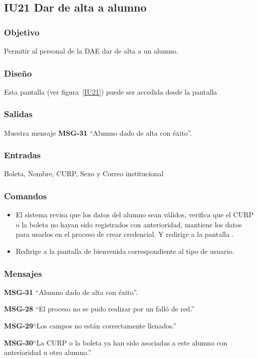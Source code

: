 
\subsection{IU21 Dar de alta a alumno}

\subsubsection{Objetivo}
	Permitir al personal de la DAE dar de alta a un alumno.
\subsubsection{Diseño}
    Esta pantalla  (ver figura~\ref{IU21}) puede ser accedida desde la pantalla 


\subsubsection{Salidas}
Muestra mensaje {\bf MSG-31} ``Alumno dado de alta con éxito''.
\subsubsection{Entradas}
    Boleta, Nombre, CURP, Sexo y Correo institucional
\subsubsection{Comandos}
\begin{itemize}
    \item {}  El sistema revisa que los datos del alumno sean válidos, verifica que el CURP o la boleta no hayan sido registrados con anterioridad, mantiene los datos para usarlos en el proceso de crear credencial. Y redirige a la pantalla .
    \item {} Redirige a la pantalla de bienvenida correspondiente al tipo de usuario.
    
\end{itemize}

\subsubsection{Mensajes}

\begin{Citemize}
    \item {\bf MSG-31} ``Alumno dado de alta con éxito''.
    \item {\bf MSG-28}  ``El proceso no se pudo realizar por un falló de red.''
    \item {\bf MSG-29}{``Los campos no están correctamente llenados.''}
    \item {\bf MSG-30}{``La CURP o la boleta ya han sido asociadas a este alumno con anterioridad u otro alumno.''}
\end{Citemize}
